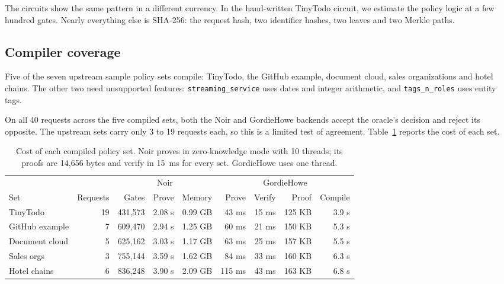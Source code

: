 \documentclass[11pt]{article}
\begin{document}
The circuits show the same pattern in a different currency. In the hand-written TinyTodo circuit, we estimate the policy logic at a few hundred gates. Nearly everything else is SHA-256: the request hash, two identifier hashes, two leaves and two Merkle paths.

\subsection{Compiler coverage}
\label{sec:coverage}

Five of the seven upstream sample policy sets compile: TinyTodo, the GitHub example, document cloud, sales organizations and hotel chains. The other two need unsupported features: \texttt{streaming\_service} uses dates and integer arithmetic, and \texttt{tags\_n\_roles} uses entity tags.

On all 40 requests across the five compiled sets, both the Noir and GordieHowe backends accept the oracle's decision and reject its opposite. The upstream sets carry only 3 to 19 requests each, so this is a limited test of agreement. Table~\ref{tab:sets} reports the cost of each set.

\begin{table}[t]
\centering
\caption{Cost of each compiled policy set. Noir proves in zero-knowledge mode with 10 threads; its proofs are 14,656 bytes and verify in 15~ms for every set. GordieHowe uses one thread.}
\label{tab:sets}
\begin{tabular}{@{}lrrrrrrrr@{}}
\toprule
 & & \multicolumn{3}{c}{Noir} & \multicolumn{4}{c}{GordieHowe} \\
\cmidrule(lr){3-5}\cmidrule(l){6-9}
Set & Requests & Gates & Prove & Memory & Prove & Verify & Proof & Compile \\
\midrule
TinyTodo & 19 & 431,573 & 2.08 s & 0.99 GB & 43 ms & 15 ms & 125 KB & 3.9 s \\
GitHub example & 7 & 609,470 & 2.94 s & 1.25 GB & 60 ms & 21 ms & 150 KB & 5.3 s \\
Document cloud & 5 & 625,162 & 3.03 s & 1.17 GB & 63 ms & 25 ms & 157 KB & 5.5 s \\
Sales orgs & 3 & 755,144 & 3.59 s & 1.62 GB & 84 ms & 33 ms & 160 KB & 6.3 s \\
Hotel chains & 6 & 836,248 & 3.90 s & 2.09 GB & 115 ms & 43 ms & 163 KB & 6.8 s \\
\bottomrule
\end{tabular}
\end{table}
\end{document}
